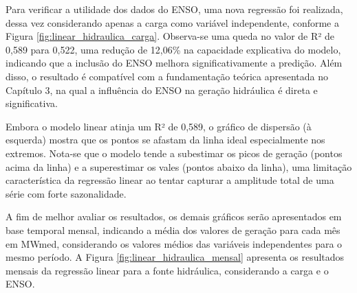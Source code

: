 Para verificar a utilidade dos dados do ENSO, uma nova regressão foi realizada, dessa vez
considerando apenas a carga como variável independente, conforme a Figura \ref{fig:linear_hidraulica_carga}. Observa-se 
uma queda no valor de R² de 0,589 para 0,522, uma redução de 12,06\% na capacidade explicativa do modelo, indicando que a 
inclusão do ENSO melhora significativamente a predição. Além disso, o resultado é compatível com a fundamentação teórica 
apresentada no Capítulo 3, na qual a influência do ENSO na geração hidráulica é direta e significativa.

\begin{figure}[!ht]
  {}
  {}
\end{figure}

Embora o modelo linear atinja um R² de 0,589, o gráfico de dispersão (à esquerda) mostra que os pontos se 
afastam da linha ideal especialmente nos extremos. Nota-se que o modelo tende a subestimar os picos de geração 
(pontos acima da linha) e a superestimar os vales (pontos abaixo da linha), uma limitação característica da regressão 
linear ao tentar capturar a amplitude total de uma série com forte sazonalidade.

A fim de melhor avaliar os resultados, os demais gráficos serão apresentados em base temporal mensal, indicando a média 
dos valores de geração para cada mês em MWmed, considerando os valores médios das variáveis independentes para o mesmo período. 
A Figura \ref{fig:linear_hidraulica_mensal} apresenta os resultados mensais da regressão linear para a fonte hidráulica, 
considerando a carga e o ENSO. 

\begin{figure}[!ht]
  {}
  {}
\end{figure}
\begin{figure}[!ht]
  {}
  {}
\end{figure}

